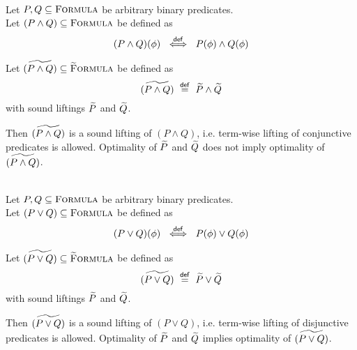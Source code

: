 \begin{lemma}\label{lemma:sl-conj-pred}~\\
    Let $P, Q \subseteq \textup{\textsc{Formula}}$ be arbitrary binary predicates.\\
    Let $(P \wedge Q) \subseteq \textup{\textsc{Formula}}$ be defined as
    \begin{displaymath}
    (P \wedge Q)(\phi) ~\overset{\textup{\textmd{\textsf{def}}}}{\iff}~ P(\phi) \wedge Q(\phi)
    \end{displaymath}
    
    Let $\widetilde{(P \wedge Q)} \subseteq \textup{\textsc{\ensuremath{\widetilde{\text{F}}}ormula}}$ be defined as
    \begin{displaymath}
    \widetilde{(P \wedge Q)} ~\overset{\textup{\textmd{\textsf{def}}}}{=}~ \widetilde{P} \wedge \widetilde{Q}
    \end{displaymath}
    with sound liftings $\widetilde{P}$ and $\widetilde{Q}$.
    
    Then $\widetilde{(P \wedge Q)}$ is a sound lifting of $(P \wedge Q)$, i.e. term-wise lifting of conjunctive predicates is allowed.
    Optimality of $\widetilde{P}$ and $\widetilde{Q}$ does not imply optimality of $\widetilde{(P \wedge Q)}$.
\end{lemma}

\begin{lemma}\label{lemma:sl-disj-pred}~\\
    Let $P, Q \subseteq \textup{\textsc{Formula}}$ be arbitrary binary predicates.\\
    Let $(P \vee Q) \subseteq \textup{\textsc{Formula}}$ be defined as
    \begin{displaymath}
    (P \vee Q)(\phi) ~\overset{\textup{\textmd{\textsf{def}}}}{\iff}~ P(\phi) \vee Q(\phi)
    \end{displaymath}
    
    Let $\widetilde{(P \vee Q)} \subseteq \textup{\textsc{\ensuremath{\widetilde{\text{F}}}ormula}}$ be defined as
    \begin{displaymath}
    \widetilde{(P \vee Q)} ~\overset{\textup{\textmd{\textsf{def}}}}{=}~ \widetilde{P} \vee \widetilde{Q}
    \end{displaymath}
    with sound liftings $\widetilde{P}$ and $\widetilde{Q}$.
    
    Then $\widetilde{(P \vee Q)}$ is a sound lifting of $(P \vee Q)$, i.e. term-wise lifting of disjunctive predicates is allowed.
    Optimality of $\widetilde{P}$ and $\widetilde{Q}$ implies optimality of $\widetilde{(P \vee Q)}$.
\end{lemma}

\begin{comment}
We define $\setGFormulaA = \{~ \grad{\phi} \in \setGFormula ~|~ \exists \pi.~ \evalgphiGen {\pi} {\grad{\phi}} ~\}$ as the set of satisfiable gradual formulas.

\begin{lemma}[Restricted Domain of Concretization]~\\
    $\restr{\gamma}{\setGFormulaA}$ never returns the empty set.
\end{lemma}

\end{comment}
